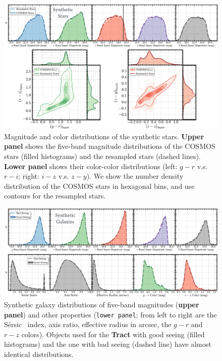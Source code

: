 \documentclass[useamsfonts]{pasj01}
\def\ser{{S\'{e}rsic\ }}
\begin{document}
\begin{figure}
    \begin{center}
        \includegraphics[width=\textwidth]{fig/synpipe_star_sample}
    \end{center}
    \caption{
        Magnitude and color distributions of the synthetic stars.
        \textbf{Upper panel} shows the five-band magnitude distributions of the COSMOS
        stars (filled histograms) and the resampled stars (dashed lines).
        \textbf{Lower panel} shows their color-color distributions
        (left: $g-r$ v.s. $r-i$; right: $i-z$ v.s. $z-y$).
        We show the number density distribution of the COSMOS stars in hexagonal bins,
        and use contours for the resampled stars.
        }
    \label{fig:star_sample}
\end{figure}

\begin{figure}
    \begin{center}
        \includegraphics[width=\textwidth]{fig/synpipe_galaxy_sample}
    \end{center}
    \caption{
        Synthetic galaxy distributions of five-band magnitudes (\textbf{upper panel}) and other properties
        (\texttt{lower panel}; from left to right are the \ser{} index, axis ratio,
        effective radius in arcsec, the $g-r$ and $r-z$ colors).
        Objects used for the \textbf{Tract} with good seeing (filled histograms) and
        the one with bad seeing (dashed line) have almost identical distributions.
        }
    \label{fig:galaxy_sample}
\end{figure}
\end{document}
